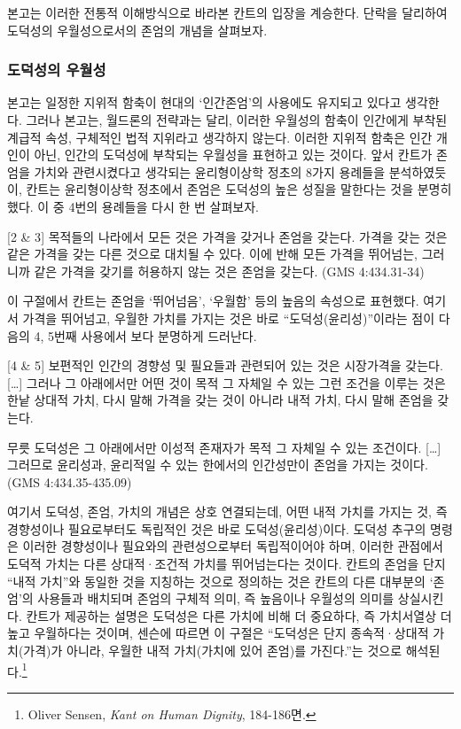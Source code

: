 본고는 이러한 전통적 이해방식으로 바라본 칸트의 입장을 계승한다. 단락을 달리하여 도덕성의 우월성으로서의 존엄의 개념을 살펴보자.

\subsubsection{도덕성의 우월성}

본고는 일정한 지위적 함축이 현대의 `인간존엄'의 사용에도 유지되고 있다고 생각한다. 그러나 본고는, 월드론의 전략과는 달리, 이러한 우월성의 함축이 인간에게 부착된 계급적 속성, 구체적인 법적 지위라고 생각하지 않는다. 이러한 지위적 함축은 인간 개인이 아닌, 인간의 도덕성에 부착되는 우월성을 표현하고 있는 것이다. 앞서 칸트가 존엄을 가치와 관련시켰다고 생각되는 윤리형이상학 정초의 8가지 용례들을 분석하였듯이, 칸트는 윤리형이상학 정초에서 존엄은 도덕성의 높은 성질을 말한다는 것을 분명히 했다. 이 중 4번의 용례들을 다시 한 번 살펴보자.

{[}2 \& 3{]} 목적들의 나라에서 모든 것은 가격을 갖거나 존엄을 갖는다. 가격을 갖는 것은 같은 가격을 갖는 다른 것으로 대치될 수 있다. 이에 반해 모든 가격을 뛰어넘는, 그러니까 같은 가격을 갖기를 허용하지 않는 것은 존엄을 갖는다. (GMS 4:434.31-34)

이 구절에서 칸트는 존엄을 `뛰어넘음', `우월함' 등의 높음의 속성으로 표현했다. 여기서 가격을 뛰어넘고, 우월한 가치를 가지는 것은 바로 ``도덕성(윤리성)''이라는 점이 다음의 4, 5번째 사용에서 보다 분명하게 드러난다.

{[}4 \& 5{]} 보편적인 인간의 경향성 및 필요들과 관련되어 있는 것은 시장가격을 갖는다. {[}\ldots{]} 그러나 그 아래에서만 어떤 것이 목적 그 자체일 수 있는 그런 조건을 이루는 것은 한낱 상대적 가치, 다시 말해 가격을 갖는 것이 아니라 내적 가치, 다시 말해 존엄을 갖는다.

무릇 도덕성은 그 아래에서만 이성적 존재자가 목적 그 자체일 수 있는 조건이다. {[}\ldots{]} 그러므로 윤리성과, 윤리적일 수 있는 한에서의 인간성만이 존엄을 가지는 것이다.(GMS 4:434.35-435.09)

여기서 도덕성, 존엄, 가치의 개념은 상호 연결되는데, 어떤 내적 가치를 가지는 것, 즉 경향성이나 필요로부터도 독립적인 것은 바로 도덕성(윤리성)이다. 도덕성 추구의 명령은 이러한 경향성이나 필요와의 관련성으로부터 독립적이어야 하며, 이러한 관점에서 도덕적 가치는 다른 상대적·조건적 가치를 뛰어넘는다는 것이다. 칸트의 존엄을 단지 ``내적 가치''와 동일한 것을 지칭하는 것으로 정의하는 것은 칸트의 다른 대부분의 `존엄'의 사용들과 배치되며 존엄의 구체적 의미, 즉 높음이나 우월성의 의미를 상실시킨다. 칸트가 제공하는 설명은 도덕성은 다른 가치에 비해 더 중요하다, 즉 가치서열상 더 높고 우월하다는 것이며, 센슨에 따르면 이 구절은 ``도덕성은 단지 종속적·상대적 가치(가격)가 아니라, 우월한 내적 가치(가치에 있어 존엄)를 가진다.''는 것으로 해석된다.\footnote{Oliver Sensen, \emph{Kant on Human Dignity}, 184-186면.}

